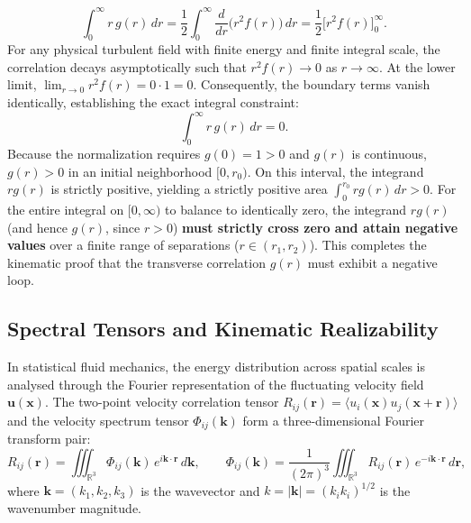 \documentclass[lineno]{jfm}
\begin{document}
\begin{equation}
\int_0^\infty r\,g(r)\,dr = \frac{1}{2} \int_0^\infty \frac{d}{dr}\big(r^2 f(r)\big)\,dr = \frac{1}{2}\Big[ r^2 f(r) \Big]_0^\infty.
\label{eq:integral_rg_derivation}
\end{equation}
For any physical turbulent field with finite energy and finite integral scale, the correlation decays asymptotically such that $r^2 f(r) \to 0$ as $r \to \infty$. At the lower limit, $\lim_{r\to 0} r^2 f(r) = 0 \cdot 1 = 0$. Consequently, the boundary terms vanish identically, establishing the exact integral constraint:
\begin{equation}
\int_0^\infty r\,g(r)\,dr = 0.
\label{eq:rg_zero_constraint_proven}
\end{equation}
Because the normalization requires $g(0) = 1 > 0$ and $g(r)$ is continuous, $g(r) > 0$ in an initial neighborhood $[0, r_0)$. On this interval, the integrand $r g(r)$ is strictly positive, yielding a strictly positive area $\int_0^{r_0} r g(r)\,dr > 0$. For the entire integral on $[0, \infty)$ to balance to identically zero, the integrand $r g(r)$ (and hence $g(r)$, since $r > 0$) \textbf{must strictly cross zero and attain negative values} over a finite range of separations ($r \in (r_1, r_2)$). This completes the kinematic proof that the transverse correlation $g(r)$ must exhibit a negative loop.

\subsection{Spectral Tensors and Kinematic Realizability}
\label{subsec:spectral_tensors}

In statistical fluid mechanics, the energy distribution across spatial scales is analysed through the Fourier representation of the fluctuating velocity field $\mathbf{u}(\mathbf{x})$. The two-point velocity correlation tensor $R_{ij}(\mathbf{r}) = \langle u_i(\mathbf{x}) u_j(\mathbf{x}+\mathbf{r}) \rangle$ and the velocity spectrum tensor $\Phi_{ij}(\mathbf{k})$ form a three-dimensional Fourier transform pair:
\begin{equation}
R_{ij}(\mathbf{r}) = \iiint_{\mathbb{R}^3} \Phi_{ij}(\mathbf{k})\,e^{i \mathbf{k} \cdot \mathbf{r}}\,d\mathbf{k}, \qquad
\Phi_{ij}(\mathbf{k}) = \frac{1}{(2\pi)^3} \iiint_{\mathbb{R}^3} R_{ij}(\mathbf{r})\,e^{-i \mathbf{k} \cdot \mathbf{r}}\,d\mathbf{r},
\label{eq:spectral_tensor_pair}
\end{equation}
where $\mathbf{k} = (k_1, k_2, k_3)$ is the wavevector and $k = |\mathbf{k}| = (k_i k_i)^{1/2}$ is the wavenumber magnitude.
\end{document}
